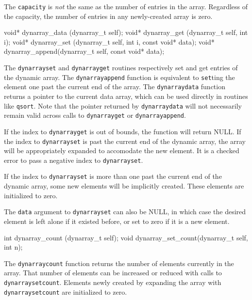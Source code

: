 The {\tt{}capacity} is \emph{not} the same as the number of
entries in the array.  Regardless of the capacity, the number
of entries in any newly-created array is zero.

\nwenddocs{}\plusendmoddef
void*      dynarray_data  (dynarray_t self);
void*      dynarray_get   (dynarray_t self, int i);
void*      dynarray_set   (dynarray_t self, int i, const void* data);
void*      dynarray_append(dynarray_t self, const void* data);

\nwendcode{}\nwdocspar

The {\tt{}dynarray{}set} and {\tt{}dynarray{}get} routines respectively
set and get entries of the dynamic array.  The {\tt{}dynarray{}append}
function is equivalent to {\tt{}set}ting the element one past the
current end of the array.  The {\tt{}dynarray{}data}
function returns a pointer to the current data array, which can
be used directly in routines like {\tt{}qsort}.  Note that the
pointer returned by {\tt{}dynarray{}data} will not necessarily remain
valid across calls to {\tt{}dynarray{}get} or {\tt{}dynarray{}append}.

If the index to {\tt{}dynarray{}get} is out of bounds, the function will 
return NULL.  If the index to {\tt{}dynarray{}set} is past the current end 
of the dynamic array, the array will be appropriately expanded to
accomodate the new element.  It is a checked error to pass a negative
index to {\tt{}dynarray{}set}.

If the index to {\tt{}dynarray{}set} is more than one past the current
end of the dynamic array, some new elements will be implicitly created.
These elements are initialized to zero.

The {\tt{}data} argument to {\tt{}dynarray{}set} can also be NULL,
in which case the desired element is left alone if it existed
before, or set to zero if it is a new element.

\nwenddocs{}\plusendmoddef
int        dynarray_count    (dynarray_t self);
void       dynarray_set_count(dynarray_t self, int n);
\nwendcode{}\nwdocspar

The {\tt{}dynarray{}count} function returns the number of elements
currently in the array.  That number of elements can be increased
or reduced with calls to {\tt{}dynarray{}set{}count}.  Elements newly
created by expanding the array with {\tt{}dynarray{}set{}count} are
initialized to zero.


